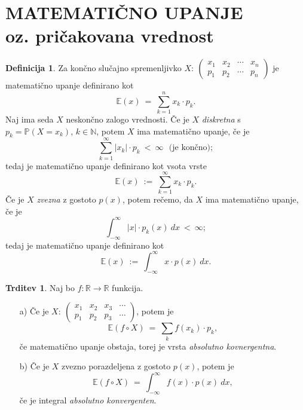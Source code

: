 \documentclass[11pt]{article}
\theoremstyle{definition}
\newtheorem{definicija}{Definicija}[section]
\theoremstyle{definition}
\newtheorem{trditev}{Trditev}[section]
\theoremstyle{definition}
\begin{document}
\pagebreak


\section{MATEMATIČNO UPANJE \\oz. pričakovana vrednost}
\vspace{0.5cm}

\begin{definicija}

Za končno slučajno spremenljivko $X: ~\begin{pmatrix}
	x_1 & x_2 & \cdots & x_n \\
	p_1 & p_2 & \cdots & p_n
\end{pmatrix}$ je matematično upanje definirano kot 
$$\mathbb{E}(x) ~=~ \sum_{k=1}^n x_k \cdot p_k.$$
Naj ima seda $X$ neskončno zalogo vrednosti. Če je $X$ \textit{diskretna} s \\ $p_k = \mathbb{P}(X = x_k)$, $k \in \mathbb{N}$, potem $X$ ima matematično upanje, če je 
$$\sum_{k=1}^{\infty} |x_k| \cdot p_k ~<~ \infty ~~~\text{(je končno)};$$
tedaj je matematično upanje definirano kot vsota vrste 
$$\mathbb{E}(x) ~:=~ \sum_{k=1}^{\infty} x_k \cdot p_k.$$
Če je $X$ \textit{zvezna} z gostoto $p(x)$, potem rečemo, da $X$ ima matematično upanje, če je
$$\int_{-\infty}^{\infty} |x| \cdot p_k(x) ~dx ~<~ \infty;$$
tedaj je matematično upanje definirano kot
$$\mathbb{E}(x) ~:=~ \int_{-\infty}^{\infty} x \cdot p(x) ~dx.$$

\end{definicija}
\vspace{0.5cm}

\begin{trditev}

Naj bo $f: \mathbb{R} \rightarrow \mathbb{R}$ funkcija.
\begin{enumerate}
	\item[a)] Če je $X: ~\begin{pmatrix}
	x_1 & x_2 & x_3 & \cdots \\
	p_1 & p_2 & p_3 & \cdots
\end{pmatrix}$, potem je 
	$$\mathbb{E}(f \circ X) ~=~ \sum_k f(x_k) \cdot p_k,$$
	če matematično upanje obstaja, torej je vrsta \textit{absolutno kovnergentna}.
	\item[b)] Če je $X$ zvezno porazdeljena z gostoto $p(x)$, potem je 
	$$\mathbb{E}(f \circ X) ~=~ \int_{-\infty}^{\infty} f(x) \cdot p(x) ~dx,$$
	če je integral \textit{absolutno konvergenten}.
\end{enumerate}

\end{trditev}
\vspace{0.5cm}
\end{document}
